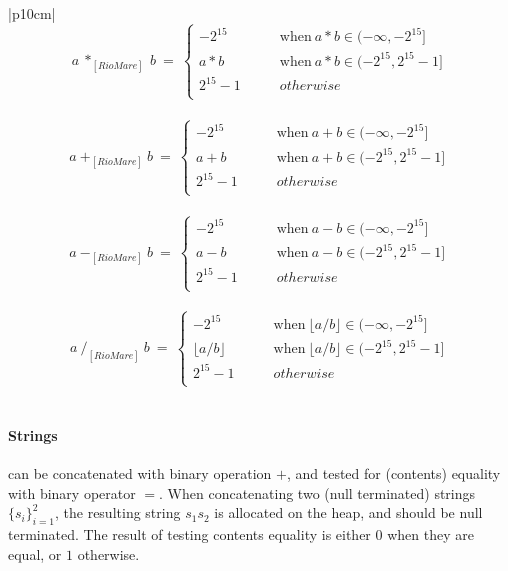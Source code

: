 \documentclass{article}
\begin{document}
\begin{table}[h]
\centering
\begin{tabular}{|p{10cm}|}
\hline
\[
a ~ *_{[RioMare]} ~ b ~ = ~
\begin{cases} 
-2^{15}  ~ & ~ ~ ~ ~ ~ ~ ~ ~ \text{when} ~ a*b \in (-\infty, -2^{15}] \\
a*b      ~ & ~ ~ ~ ~ ~ ~ ~ ~ \text{when} ~ a*b \in (-2^{15},2^{15}-1] \\
2^{15}-1 ~ & ~ ~ ~ ~ ~ ~ ~ ~ otherwise                                \\
\end{cases}
\]
\\ \hline
\[
a ~ +_{[RioMare]} ~ b ~ = ~
\begin{cases} 
-2^{15}  ~ & ~ ~ ~ ~ ~ ~ ~ ~ \text{when} ~ a+b \in (-\infty, -2^{15}] \\
a+b      ~ & ~ ~ ~ ~ ~ ~ ~ ~ \text{when} ~ a+b \in (-2^{15},2^{15}-1] \\
2^{15}-1 ~ & ~ ~ ~ ~ ~ ~ ~ ~ otherwise                                \\
\end{cases}
\]
\\ \hline
\[
a ~ -_{[RioMare]} ~ b ~ = ~
\begin{cases} 
-2^{15}  ~ & ~ ~ ~ ~ ~ ~ ~ ~ \text{when} ~ a-b \in (-\infty, -2^{15}] \\
a-b      ~ & ~ ~ ~ ~ ~ ~ ~ ~ \text{when} ~ a-b \in (-2^{15},2^{15}-1] \\
2^{15}-1 ~ & ~ ~ ~ ~ ~ ~ ~ ~ otherwise                                \\
\end{cases}
\]
\\ \hline
\[
a ~ /_{[RioMare]} ~ b ~ = ~
\begin{cases} 
-2^{15}             ~ & ~ ~ ~ ~ ~ ~ ~ ~ \text{when} ~ \lfloor a/b \rfloor \in (-\infty, -2^{15}] \\
\lfloor a/b \rfloor ~ & ~ ~ ~ ~ ~ ~ ~ ~ \text{when} ~ \lfloor a/b \rfloor \in (-2^{15},2^{15}-1] \\
2^{15}-1            ~ & ~ ~ ~ ~ ~ ~ ~ ~ otherwise                                                \\
\end{cases}
\]
\\ \hline
\end{tabular}
\caption{Semantics of RioMare binary operations between integers
\label{Table_Semantics_Of_Rio_Mare_Binary_Operations_Between_Integers}}
\end{table}
\paragraph{Strings} can be concatenated with binary operation $+$,
and tested for (contents) equality with binary operator $=$.
When concatenating two (null terminated) strings $\{s_{i}\}_{i=1}^{2}$,
the resulting string $s_{1}s_{2}$ is allocated on the heap,
and should be null terminated. The result of testing contents equality
is either $0$ when they are equal, or $1$ otherwise.
\newpage
\end{document}
